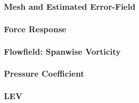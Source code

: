\subsubsection{Mesh and Estimated Error-Field}

\label{sec:zonal_mesh_and_error}

\subsubsection{Force Response}

\label{sec:zonal_force_response}

\subsubsection{Flowfield: Spanwise Vorticity}

\label{sec:zonal_vorticity}

\subsubsection{Pressure Coefficient}

\label{sec:zonal_cp}

\subsubsection{LEV}

\label{sec:zonal_LEV}



%

